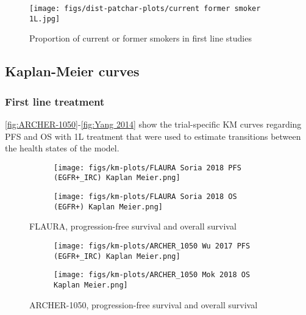 \documentclass[11pt,final,fleqn]{article}\usepackage[]{graphicx}\usepackage[]{color}
\theoremstyle{plain}
\begin{document}
\begin{appendices}
\begin{figure}
\centering
\texttt{[image: figs/dist-patchar-plots/current former smoker 1L.jpg]}
\caption{Proportion of current or former smokers in first line studies}\label{fig:currentformermoker-1l}
\end{figure}

\FloatBarrier


\subsection{Kaplan-Meier curves} \label{app:km-curves}
\subsubsection{First line treatment}
\autoref{fig:ARCHER-1050}-\autoref{fig:Yang 2014} show the trial-specific KM curves regarding PFS and OS with 1L treatment that were used to estimate transitions between the health states of the model.


\begin{figure}
\centering
\begin{subfigure}{\textwidth}
\centering
\texttt{[image: figs/km-plots/FLAURA Soria 2018 PFS (EGFR+\_IRC) Kaplan Meier.png]}
\end{subfigure}
\begin{subfigure}{\textwidth}
\texttt{[image: figs/km-plots/FLAURA Soria 2018 OS (EGFR+) Kaplan Meier.png]}
\end{subfigure}
\centering
\caption{FLAURA, progression-free survival and overall survival}\label{fig:FLAURA}
\end{figure}


\begin{figure}
\centering
\begin{subfigure}{\textwidth}
\centering
\texttt{[image: figs/km-plots/ARCHER\_1050 Wu 2017 PFS (EGFR+\_IRC) Kaplan Meier.png]}
\end{subfigure}
\begin{subfigure}{\textwidth}
\texttt{[image: figs/km-plots/ARCHER\_1050 Mok 2018 OS Kaplan Meier.png]}
\end{subfigure}
\centering
\caption{ARCHER-1050, progression-free survival and overall survival}\label{fig:ARCHER-1050}
\end{figure}




\end{appendices}
\end{document}
